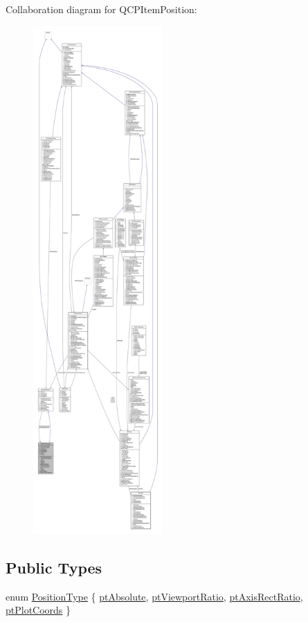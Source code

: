 Collaboration diagram for Q\+C\+P\+Item\+Position\+:\nopagebreak
\begin{figure}[H]
\begin{center}
\leavevmode
\includegraphics[height=550pt]{class_q_c_p_item_position__coll__graph}
\end{center}
\end{figure}
\subsection*{Public Types}
\begin{DoxyCompactItemize}
\item 
enum \hyperlink{class_q_c_p_item_position_aad9936c22bf43e3d358552f6e86dbdc8}{Position\+Type} \{ \hyperlink{class_q_c_p_item_position_aad9936c22bf43e3d358552f6e86dbdc8a564f5e53e550ead1ec5fc7fc7d0b73e0}{pt\+Absolute}, 
\hyperlink{class_q_c_p_item_position_aad9936c22bf43e3d358552f6e86dbdc8ac7d6aa89ceacb39658b0d6da061c789a}{pt\+Viewport\+Ratio}, 
\hyperlink{class_q_c_p_item_position_aad9936c22bf43e3d358552f6e86dbdc8a01080fd00eaf09fa238ef6b73bbfef75}{pt\+Axis\+Rect\+Ratio}, 
\hyperlink{class_q_c_p_item_position_aad9936c22bf43e3d358552f6e86dbdc8ad5ffb8dc99ad73263f7010c77342294c}{pt\+Plot\+Coords}
 \}
\end{DoxyCompactItemize}
